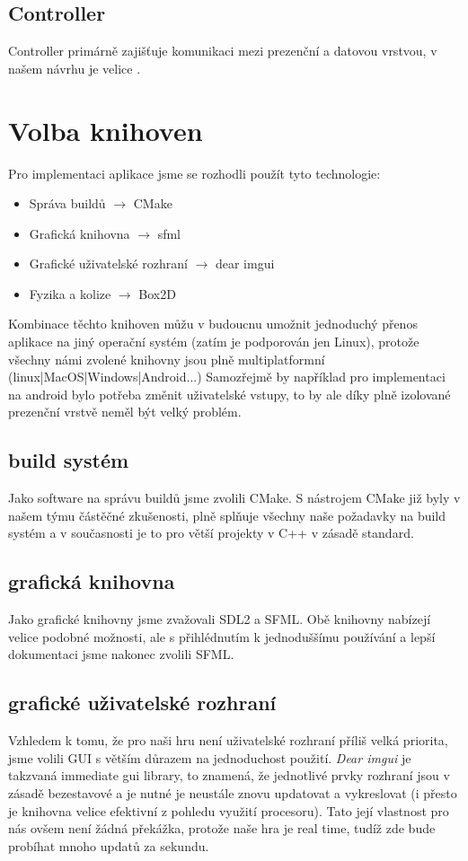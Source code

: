\documentclass[12pt,a4paper]{article}
\begin{document}
\subsection{Controller}
Controller primárně zajišťuje komunikaci mezi prezenční a datovou vrstvou, v
našem návrhu je velice .

\section{Volba knihoven}
Pro implementaci aplikace jsme se rozhodli použít tyto technologie:

\begin{itemize}
\item Správa buildů $\rightarrow$ CMake
\item Grafická knihovna $\rightarrow$ sfml
\item Grafické uživatelské rozhraní $\rightarrow$ dear imgui
\item Fyzika a kolize $\rightarrow$ Box2D
\end{itemize}

Kombinace těchto knihoven můžu v budoucnu umožnit jednoduchý přenos aplikace na
jiný operační systém (zatím je podporován jen Linux), protože všechny námi
zvolené knihovny jsou plně multiplatformní (linux|MacOS|Windows|Android...)
Samozřejmě by například pro implementaci na android bylo potřeba změnit
uživatelské vstupy, to by ale díky plně izolované prezenční vrstvě neměl být
velký problém.

\subsection{build systém}
Jako software na správu buildů jsme zvolili CMake. S nástrojem CMake již byly v
našem týmu částěčné zkušenosti, plně splňuje všechny naše požadavky na build
systém a v současnosti je to pro větší projekty v C++ v zásadě standard.

\subsection{grafická knihovna}
Jako grafické knihovny jsme zvažovali SDL2 a SFML. Obě knihovny nabízejí velice
podobné možnosti, ale s přihlédnutím k jednoduššímu používání a lepší
dokumentaci jsme nakonec zvolili SFML.

\subsection{grafické uživatelské rozhraní}
Vzhledem k tomu, že pro naši hru není uživatelské rozhraní příliš velká
priorita, jsme volili GUI s větším důrazem na jednoduchost použití. \emph{Dear
imgui} je takzvaná immediate gui library, to znamená, že jednotlivé prvky
rozhraní jsou v zásadě bezestavové a je nutné je neustále znovu updatovat a
vykreslovat (i přesto je knihovna velice efektivní z pohledu  využití
procesoru). Tato její vlastnost pro nás ovšem není žádná překážka, protože naše
hra je real time, tudíž zde bude probíhat mnoho updatů za sekundu.  
\end{document}
